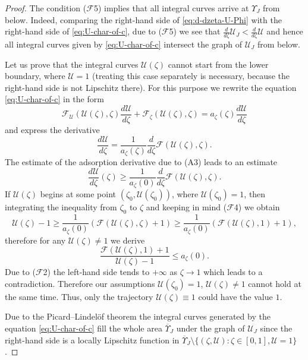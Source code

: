 \documentclass[12pt]{article}
\renewcommand{\leq}{\leqslant}
\renewcommand{\geq}{\geqslant}
\theoremstyle{definition}
\begin{document}
\begin{proof}
The condition ($\mathcal F$5) implies that all integral curves arrive at $\Upsilon_J$ from below. 
Indeed, comparing the right-hand side of \eqref{eq:d-dzeta-U-Phi} with the right-hand side of \eqref{eq:U-char-of-c}, due to ($\mathcal F$5) we see that $\frac{d}{d\zeta}\mathcal U_J < \frac{d}{d\zeta}\mathcal U$ and hence all integral curves given by \eqref{eq:U-char-of-c} intersect the graph of $\mathcal U_J$ from below. 

Let us prove that the integral curves $\mathcal U(\zeta)$ cannot start from the lower boundary, where $\mathcal U = 1$ (treating this case separately is necessary, because the right-hand side is not Lipschitz there). For this purpose we rewrite the equation \eqref{eq:U-char-of-c} in the form
\[
\mathcal F_{\mathcal U}(\mathcal U(\zeta), \zeta) \frac{d\mathcal U}{d \zeta} + \mathcal F_\zeta(\mathcal U(\zeta),\zeta) =   a_\zeta(\zeta)\frac{d\mathcal U}{d \zeta}
\]
and express the derivative
\[
 \frac{d\mathcal U}{d \zeta} = \frac{1}{a_\zeta(\zeta)}\frac{d}{d\zeta}\mathcal F(\mathcal U(\zeta), \zeta).
\]
The estimate of the adsorption derivative due to (A3) leads to an estimate
\[
\frac{d\mathcal U}{d\zeta}(\zeta) \geq \frac{1}{a_\zeta(0)}\frac{d}{d\zeta}\mathcal F(\mathcal U(\zeta), \zeta).
\]
If $\mathcal U(\zeta)$ begins at some point $(\zeta_0, \mathcal U(\zeta_0))$, where $\mathcal U(\zeta_0) = 1$, then integrating the inequality from $\zeta_0$ to $\zeta$ and keeping in mind ($\mathcal F$4) we obtain
\[
\mathcal U(\zeta) - 1\geq \frac{1}{a_\zeta(0)}\left(
\mathcal F(\mathcal U(\zeta),\zeta) + 1\right)\geq \frac{1}{a_\zeta(0)}\left(
\mathcal F(\mathcal U(\zeta),1) + 1\right),
\]
therefore for any $\mathcal U(\zeta) \neq 1$ we derive
\[
\frac{\mathcal F(\mathcal U(\zeta), 1) + 1}{\mathcal U(\zeta) - 1}\leq a_\zeta(0).
\]
Due to ($\mathcal F$2) the left-hand side tends to $+\infty$ as $\zeta\to 1$ which leads to a contradiction. Therefore our assumptions $\mathcal U(\zeta_0) = 1$, $\mathcal U(\zeta) \neq 1$ cannot hold at the same time. Thus, only the trajectory $\mathcal U(\zeta) \equiv 1$ could have the value $1$.

Due to the Picard--Lindel\"of theorem the integral curves generated by the equation \eqref{eq:U-char-of-c} fill the whole area $\overline {\Upsilon}_J$ under the graph of $\mathcal U_J$ 
since the right-hand side 
is a locally Lipschitz function in $\overline{\Upsilon}_J \setminus \{(\zeta, \mathcal U): \zeta\in[0,1], \mathcal U = 1\}$.
\end{proof}
\end{document}
